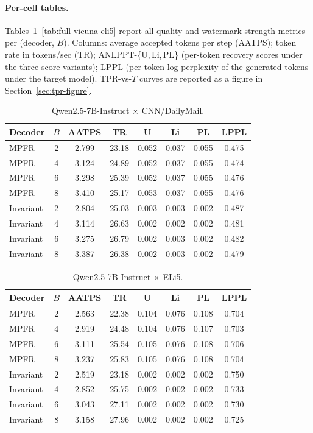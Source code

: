 \paragraph{Per-cell tables.}
Tables~\ref{tab:full-qwen-cnn}--\ref{tab:full-vicuna-eli5} report all
quality and watermark-strength metrics per (decoder, $B$).  Columns:
average accepted tokens per step (AATPS); token rate in tokens/sec
(TR); ANLPPT-\{U,\,Li,\,PL\} (per-token recovery scores under the
three score variants); LPPL (per-token log-perplexity of the generated
tokens under the target model).  TPR-vs-$T$ curves are reported as a
figure in Section~\ref{sec:tpr-figure}.

\begin{table}[h]
\centering
\small
\caption{Qwen2.5-7B-Instruct $\times$ CNN/DailyMail.}
\label{tab:full-qwen-cnn}
\begin{tabular}{l c c c c c c c}
\toprule
Decoder & $B$ & AATPS & TR & U & Li & PL & LPPL \\
\midrule
MPFR      & 2 & 2.799 & 23.18 & 0.052 & 0.037 & 0.055 & 0.475 \\
MPFR      & 4 & 3.124 & 24.89 & 0.052 & 0.037 & 0.055 & 0.474 \\
MPFR      & 6 & 3.298 & 25.39 & 0.052 & 0.037 & 0.055 & 0.476 \\
MPFR      & 8 & 3.410 & 25.17 & 0.053 & 0.037 & 0.055 & 0.476 \\
Invariant & 2 & 2.804 & 25.03 & 0.003 & 0.003 & 0.002 & 0.487 \\
Invariant & 4 & 3.114 & 26.63 & 0.002 & 0.002 & 0.002 & 0.481 \\
Invariant & 6 & 3.275 & 26.79 & 0.002 & 0.003 & 0.002 & 0.482 \\
Invariant & 8 & 3.387 & 26.38 & 0.002 & 0.003 & 0.002 & 0.479 \\
\bottomrule
\end{tabular}
\end{table}

\begin{table}[h]
\centering
\small
\caption{Qwen2.5-7B-Instruct $\times$ ELi5.}
\label{tab:full-qwen-eli5}
\begin{tabular}{l c c c c c c c}
\toprule
Decoder & $B$ & AATPS & TR & U & Li & PL & LPPL \\
\midrule
MPFR      & 2 & 2.563 & 22.38 & 0.104 & 0.076 & 0.108 & 0.704 \\
MPFR      & 4 & 2.919 & 24.48 & 0.104 & 0.076 & 0.107 & 0.703 \\
MPFR      & 6 & 3.111 & 25.54 & 0.105 & 0.076 & 0.108 & 0.706 \\
MPFR      & 8 & 3.237 & 25.83 & 0.105 & 0.076 & 0.108 & 0.704 \\
Invariant & 2 & 2.519 & 23.18 & 0.002 & 0.002 & 0.002 & 0.750 \\
Invariant & 4 & 2.852 & 25.75 & 0.002 & 0.002 & 0.002 & 0.733 \\
Invariant & 6 & 3.043 & 27.11 & 0.002 & 0.002 & 0.002 & 0.730 \\
Invariant & 8 & 3.158 & 27.96 & 0.002 & 0.002 & 0.002 & 0.725 \\
\bottomrule
\end{tabular}
\end{table}

